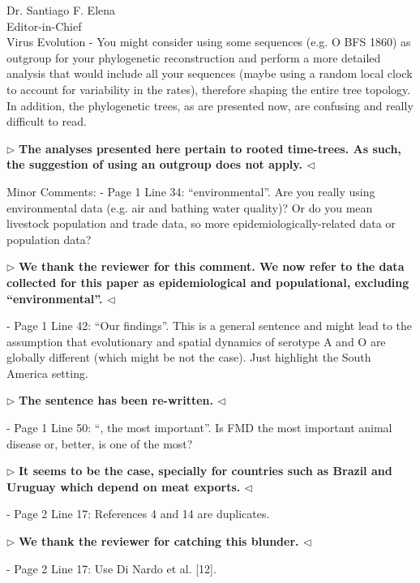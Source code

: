 \documentclass[12pt, a4paper]{letter} %
\newenvironment{reply}{$\triangleright$\bf}{$\triangleleft$}
\begin{document}
\begin{letter}{
	Dr. Santiago F. Elena\\
    Editor-in-Chief \\
    Virus Evolution
}
-       You might consider using some sequences (e.g. O BFS 1860) as outgroup for your phylogenetic reconstruction and perform a more detailed analysis that would include all your sequences (maybe using a random local clock to account for variability in the rates), therefore shaping the entire tree topology. 
In addition, the phylogenetic trees, as are presented now, are confusing and really difficult to read.

\begin{reply}
The analyses presented here pertain to rooted time-trees. 
As such, the suggestion of using an outgroup does not apply.
\end{reply}

Minor Comments:
-       Page 1 Line 34: ``environmental''. 
Are you really using environmental data (e.g. air and bathing water quality)? 
Or do you mean livestock population and trade data, so more epidemiologically-related data or population data?

\begin{reply}
We thank the reviewer for this comment.
We now  refer to the data collected for this paper as epidemiological and populational, excluding ``environmental''.
\end{reply}

-       Page 1 Line 42: ``Our findings''. 
This is a general sentence and might lead to the assumption that evolutionary and spatial dynamics of serotype A and O are globally different (which might be not the case). 
Just highlight the South America setting.

\begin{reply}
The sentence has been re-written.
\end{reply}

-       Page 1 Line 50: ``, the most important''. 
Is FMD the most important animal disease or, better, is one of the most?

\begin{reply}
It seems to be the case, specially for countries such as Brazil and Uruguay which depend on meat exports.
\end{reply}

-       Page 2 Line 17: References 4 and 14 are duplicates.

\begin{reply}
We thank the reviewer for catching this blunder.
\end{reply}

-       Page 2 Line 17: Use Di Nardo et al. [12].


\end{letter}
\end{document}

